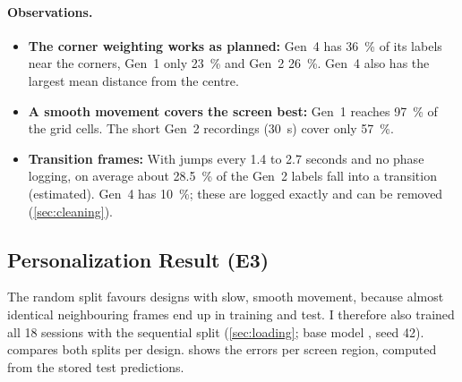 \paragraph{Observations.}
\begin{itemize}[nosep]
  \item \textbf{The corner weighting works as planned:} Gen~4 has
        \SI{36}{\percent} of its labels near the corners, Gen~1 only
        \SI{23}{\percent} and Gen~2 \SI{26}{\percent}. Gen~4 also has the
        largest mean distance from the centre.
  \item \textbf{A smooth movement covers the screen best:} Gen~1 reaches
        \SI{97}{\percent} of the grid cells. The short Gen~2 recordings
        (\SI{30}{\second}) cover only \SI{57}{\percent}.
  \item \textbf{Transition frames:} With jumps every 1.4 to 2.7 seconds and no
        phase logging, on average about \SI{28.5}{\percent} of the Gen~2 labels fall into a
        transition (estimated). Gen~4 has \SI{10}{\percent}; these are logged exactly and
        can be removed (\cref{sec:cleaning}).
\end{itemize}

\subsection{Personalization Result (E3)}
\label{sec:design_performance}

The random split favours designs with slow, smooth movement, because almost
identical neighbouring frames end up in training and test. I therefore also
trained all 18 sessions with the sequential split (\cref{sec:loading}; base
model , seed 42).  compares both splits
per design.  shows the errors per screen region,
computed from the stored test predictions.

